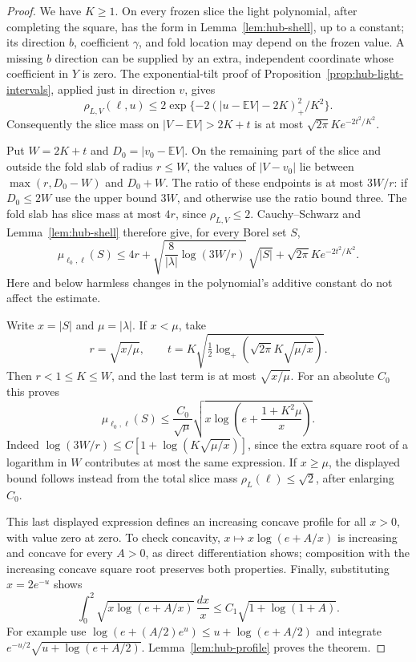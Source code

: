 \begin{proof}
We have $K\ge1$.  On every frozen slice the light polynomial,
after completing the square, has the form in
Lemma~\ref{lem:hub-shell}, up to a constant; its direction $b$,
coefficient $\gamma$, and fold location may depend on the frozen
value.  A missing $b$ direction can be supplied by an extra,
independent coordinate whose coefficient in $Y$ is zero.
The exponential-tilt proof of
Proposition~\ref{prop:hub-light-intervals}, applied just in direction
$v$, gives
\[
 \rho_{L,V}(\ell,u)
 \le 2\exp\{-2(|u-\mathbb EV|-2K)_+^2/K^2\}.
\]
Consequently the slice mass on
$|V-\mathbb EV|>2K+t$ is at most
$\sqrt{2\pi}K e^{-2t^2/K^2}$.

Put $W=2K+t$ and $D_0=|v_0-\mathbb EV|$.
On the remaining part of the slice and outside the fold slab of
radius $r\le W$, the values of $|V-v_0|$ lie between
$\max(r,D_0-W)$ and $D_0+W$.  The ratio of these endpoints is at
most $3W/r$: if $D_0\le2W$ use the upper bound $3W$, and otherwise
use the ratio bound three.  The fold slab has slice mass at most
$4r$, since $\rho_{L,V}\le2$.  Cauchy--Schwarz and
Lemma~\ref{lem:hub-shell} therefore give, for every Borel set $S$,
\[
 \mu_{\ell_0,\ell}(S)
 \le4r+\sqrt{\frac8{|\lambda|}\log(3W/r)}\,\sqrt{|S|}
                  +\sqrt{2\pi}K e^{-2t^2/K^2}.
\]
Here and below harmless changes in the polynomial's additive
constant do not affect the estimate.

Write $x=|S|$ and $\mu=|\lambda|$.  If $x<\mu$, take
\[
 r=\sqrt{x/\mu},\qquad
 t=K\sqrt{\tfrac12\log_+
                       (\sqrt{2\pi}K\sqrt{\mu/x})}.
\]
Then $r<1\le K\le W$, and the last term is at most
$\sqrt{x/\mu}$.  For an absolute $C_0$ this proves
\[
 \mu_{\ell_0,\ell}(S)
 \le\frac{C_0}{\sqrt\mu}
       \sqrt{x\log\!\left(e+\frac{1+K^2\mu}{x}\right)}.
\]
Indeed $\log(3W/r)\le
C[1+\log(K\sqrt{\mu/x})]$, since the extra square root of a logarithm
in $W$ contributes at most the same expression.  If $x\ge\mu$,
the displayed bound follows instead from the total slice mass
$\rho_L(\ell)\le\sqrt2$, after enlarging $C_0$.

This last displayed expression defines an increasing concave
profile for all $x>0$, with value zero at zero.
To check concavity, $x\mapsto x\log(e+A/x)$ is increasing and
concave for every $A>0$, as direct differentiation shows;
composition with the increasing concave square root preserves both
properties.  Finally, substituting $x=2e^{-u}$ shows
\[
 \int_0^2\sqrt{x\log(e+A/x)}\,\frac{dx}{x}
 \le C_1\sqrt{1+\log(1+A)}.
\]
For example use
$\log(e+(A/2)e^u)\le u+\log(e+A/2)$ and integrate
$e^{-u/2}\sqrt{u+\log(e+A/2)}$.
Lemma~\ref{lem:hub-profile} proves the theorem.
\end{proof}


